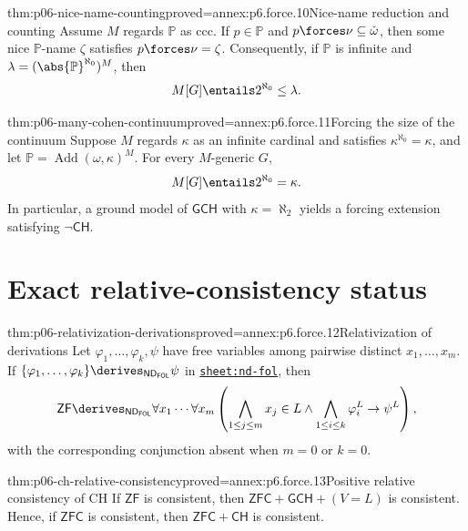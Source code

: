 \begin{hbtheorem}{thm:p06-nice-name-counting}{proved=annex:p6.force.10}{Nice-name reduction and counting}
Assume \(M\) regards \(\mathbb P\) as ccc.  If \(p\in\mathbb P\) and
\(p\forces\nu\subseteq\check\omega\), then some nice
\(\mathbb P\)-name \(\zeta\) satisfies \(p\forces\nu=\zeta\).
Consequently, if \(\mathbb P\) is infinite and
\(\lambda=(\abs{\mathbb P}^{\aleph_0})^M\), then
\[
  M[G]\entails 2^{\aleph_0}\leq\lambda.
\]
\end{hbtheorem}

\begin{hbcorollary}{thm:p06-many-cohen-continuum}{proved=annex:p6.force.11}{Forcing the size of the continuum}
Suppose \(M\) regards \(\kappa\) as an infinite cardinal and satisfies
\(\kappa^{\aleph_0}=\kappa\), and let
\(\mathbb P=\operatorname{Add}(\omega,\kappa)^M\).  For every
\(M\)-generic \(G\),
\[
  M[G]\entails 2^{\aleph_0}=\kappa.
\]
In particular, a ground model of \(\mathsf{GCH}\) with
\(\kappa=\aleph_2\) yields a forcing extension satisfying
\(\neg\mathsf{CH}\).
\end{hbcorollary}

\section{Exact relative-consistency status}
\label{sec:p06-relative-consistency}

\begin{hblemma}{thm:p06-relativization-derivations}{proved=annex:p6.force.12}{Relativization of derivations}
Let \(\varphi_1,\ldots,\varphi_k,\psi\) have free variables among pairwise
distinct \(x_1,\ldots,x_m\).  If
\(\{\varphi_1,\ldots,\varphi_k\}
  \derives_{\mathsf{ND}_{\mathsf{FOL}}}\psi\) in
\hyperref[sheet:nd-fol]{\texttt{sheet:nd-fol}}, then
\[
  \mathsf{ZF}\derives_{\mathsf{ND}_{\mathsf{FOL}}}
  \forall x_1\cdots\forall x_m
  \left(
    \bigwedge_{1\leq j\leq m}x_j\in L\land
    \bigwedge_{1\leq i\leq k}\varphi_i^L
    \to\psi^L
  \right),
\]
with the corresponding conjunction absent when \(m=0\) or \(k=0\).
\end{hblemma}

\begin{hbtheorem}{thm:p06-ch-relative-consistency}{proved=annex:p6.force.13}{Positive relative consistency of CH}
If \(\mathsf{ZF}\) is consistent, then
\(\mathsf{ZFC}+\mathsf{GCH}+(V=L)\) is consistent.  Hence, if
\(\mathsf{ZFC}\) is consistent, then
\(\mathsf{ZFC}+\mathsf{CH}\) is consistent.
\end{hbtheorem}

